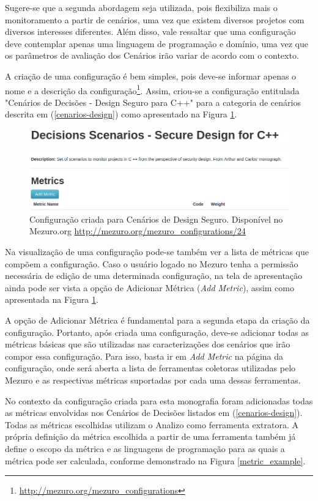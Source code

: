 Sugere-se que a segunda abordagem seja utilizada, pois flexibiliza mais o monitoramento a partir de cenários, uma vez que existem diversos projetos com diversos interesses diferentes. Além disso, vale ressaltar que uma configuração deve contemplar apenas uma linguagem de programação e domínio, uma vez que os parâmetros de avaliação dos Cenários irão variar de acordo com o contexto.

A criação de uma configuração é bem simples, pois deve-se informar apenas o nome e a descrição da configuração\footnote{\url{http://mezuro.org/mezuro_configurations}}. Assim, criou-se a configuração entitulada "Cenários de Decisões - Design Seguro para C++" para a categoria de cenários descrita em (\ref{cenarios-design}) como apresentado na Figura \ref{cenario_design}.

\graphicspath{{figuras/}}
\begin{figure}[h]
\centering
\includegraphics[width=1.0\textwidth]{cenario_design}
\caption{Configuração criada para Cenários de Design Seguro. Disponível no Mezuro.org \url{http://mezuro.org/mezuro_configurations/24}}
\label{cenario_design}
\end{figure}

Na visualização de uma configuração pode-se também ver a lista de métricas que compõem a configuração. Caso o usuário logado no Mezuro tenha a permissão  necessária de edição de uma determinada configuração, na tela de apresentação ainda pode ser vista a opção de Adicionar Métrica (\emph{Add Metric}), assim como apresentada na Figura \ref{cenario_design}. 

A opção de Adicionar Métrica é fundamental para a segunda etapa da criação da configuração. Portanto, após criada uma configuração, deve-se adicionar todas as métricas básicas que são utilizadas nas caracterizações dos cenários que irão compor essa configuração. Para isso, basta ir em \emph{Add Metric} na página da configuração, onde será aberta a lista de ferramentas coletoras utilizadas pelo Mezuro e as respectivas métricas suportadas por cada uma dessas ferramentas. 

No contexto da configuração criada para esta monografia foram adicionadas todas as métricas envolvidas nos Cenários de Decisões listados em (\ref{cenarios-design}). Todas as métricas escolhidas utilizam o Analizo como ferramenta extratora. A própria definição da métrica escolhida a partir de uma ferramenta também já define o escopo da métrica e as linguagens de programação para as quais a métrica pode ser calculada, conforme demonstrado na Figura \ref{metric_example}.

